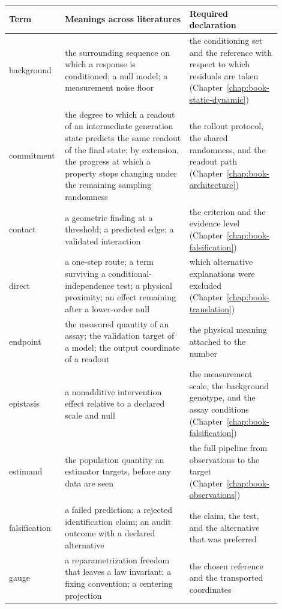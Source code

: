 \begin{center}
\small
\setlength{\tabcolsep}{4pt}
\begin{tabular}{@{}>{\raggedright\arraybackslash}p{0.14\linewidth}
                >{\raggedright\arraybackslash}p{0.44\linewidth}
                >{\raggedright\arraybackslash}p{0.32\linewidth}@{}}
\toprule
Term & Meanings across literatures & Required declaration \\
\midrule
background & the surrounding sequence on which a response is conditioned; a null model; a
measurement noise floor &
the conditioning set and the reference with respect to which residuals are taken
(Chapter~\ref{chap:book-static-dynamic}) \\
commitment & the degree to which a readout of an intermediate generation state predicts the same
readout of the final state; by extension, the progress at which a property stops changing under
the remaining sampling randomness &
the rollout protocol, the shared randomness, and the readout path
(Chapter~\ref{chap:book-architecture}) \\
contact & a geometric finding at a threshold; a predicted edge; a validated interaction &
the criterion and the evidence level (Chapter~\ref{chap:book-falsification}) \\
direct & a one-step route; a term surviving a conditional-independence test; a physical
proximity; an effect remaining after a lower-order null &
which alternative explanations were excluded (Chapter~\ref{chap:book-translation}) \\
endpoint & the measured quantity of an assay; the validation target of a model; the output
coordinate of a readout &
the physical meaning attached to the number \\
epistasis & a nonadditive intervention effect relative to a declared scale and null &
the measurement scale, the background genotype, and the assay conditions
(Chapter~\ref{chap:book-falsification}) \\
estimand & the population quantity an estimator targets, before any data are seen &
the full pipeline from observations to the target (Chapter~\ref{chap:book-observations}) \\
falsification & a failed prediction; a rejected identification claim; an audit outcome with a
declared alternative &
the claim, the test, and the alternative that was preferred \\
gauge & a reparametrization freedom that leaves a law invariant; a fixing convention; a
centering projection &
the chosen reference and the transported coordinates

\end{tabular}
\end{center}
